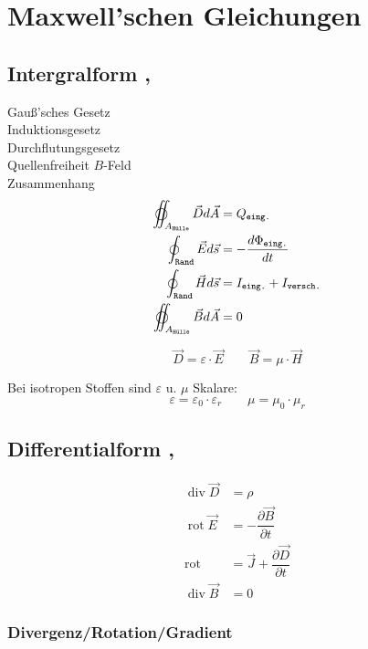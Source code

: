\section{Maxwell’schen Gleichungen}

\subsection{Intergralform , }
Gauß'sches Gesetz\\
Induktionsgesetz\\
Durchflutungsgesetz\\
Quellenfreiheit $B$-Feld\\
Zusammenhang
\begin{align*}
    \varoiint_{A_\texttt{Hülle}} \vec{D} d \vec{A} & = Q_\texttt{eing.}                      \\
    \oint_\texttt{Rand} \vec{E} d \vec{s}          & = -\dfrac{d\Phi_\texttt{eing.}}{dt}     \\
    \oint_\texttt{Rand} \vec{H} d \vec{s}          & = I_\texttt{eing.} + I_\texttt{versch.} \\
    \varoiint_{A_\texttt{Hülle}} \vec{B} d \vec{A} & = 0
\end{align*}

\[
    \vec{D} = \varepsilon \cdot \vec{E} \qquad
    \vec{B} = \mu \cdot \vec{H}
\]

Bei isotropen Stoffen sind $\varepsilon$ u. $\mu$ Skalare:
\[
    \varepsilon = \varepsilon_0 \cdot \varepsilon_r \qquad \mu = \mu_0 \cdot \mu_r
\]

\subsection{Differentialform , }
\begin{align*}
    \operatorname{div} \vec{D} &= \rho\\
    \operatorname{rot} \vec{E} &= -\dfrac{\partial \vec{B}}{\partial t}\\
    \operatorname{rot} &= \vec{J} + \dfrac{\partial \vec{D}}{\partial t} \\
    \operatorname{div} \vec{B} &= 0
\end{align*}

\subsubsection*{Divergenz/Rotation/Gradient}

